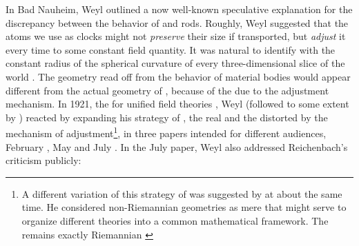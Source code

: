 \documentclass[draft]{article}
\begin{document}
In Bad Nauheim, Weyl outlined a now well-known speculative explanation for the discrepancy between the behavior of  and  rods. Roughly, Weyl suggested that the atoms we use as clocks might not \emph{preserve} their size if transported, but \emph{adjust} it every time to some constant field quantity. It was natural to identify with the constant radius of the spherical curvature of every three-dimensional slice of the world \citep{Weyl1920a}. The geometry read off from the behavior of material bodies would appear different from the actual geometry of \spti, because of the  due to the adjustment mechanism. In 1921, the  for unified field theories \citep[ch.\ 4]{Vizgin1994}, Weyl (followed to some extent by \cite{Eddington1921,Eddington1921a}) reacted by expanding his strategy of , the real  and the  distorted by the mechanism of adjustment\footnote{A different variation of this strategy of  was suggested by \citet{Eddington1921} at about the same time. He considered non-Riemannian geometries as mere  that might serve to organize different theories into a common mathematical framework. The  remains exactly Riemannian \citep{Eddington1921}}, in three papers intended for different audiences, February \citep{Weyl1921a}, May \citep{Weyl1921d} and July \citep{Weyl1921e}. In the July paper, Weyl also addressed Reichenbach's criticism publicly:
\end{document}
